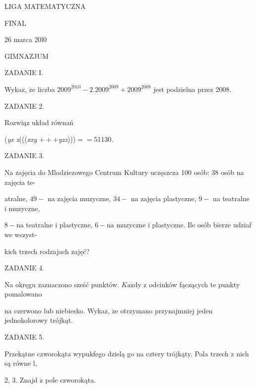 \documentclass[a4paper,12pt]{article}
\begin{document}
LIGA MATEMATYCZNA

FINAL

26 marca 20l0

GIMNAZJUM

ZADANIE I.

Wykaz, $\dot{\mathrm{z}}\mathrm{e}$ liczba $2009^{2010}-2. 2009^{2009}+2009^{2008}$ jest podzielna przez 2008.

ZADANIE 2.

Rozwiąz układ równań

({\it yx  z}((({\it xxy} $+++${\it yzz})))$==$51130.

ZADANIE 3.

Na zajęcia do Mlodziezowego Centrum Kultury uczęszcza 100 osób: 38 osób na zajęcia te-

atralne, $49-$ na zajęcia muzyczne, $34-$ na zajęcia plastyczne, $9-$ na teatralne i muzyczne,

$8-\mathrm{n}\mathrm{a}$ teatralne i plastyczne, $6-\mathrm{n}\mathrm{a}$ muzyczne i plastyczne. Ile osób bierze udziaf we wszyst-

kich trzech rodzajach zajęć?

ZADANIE 4.

Na okręgu zaznaczono sześć punktów. $K\mathrm{a}\dot{\mathrm{z}}\mathrm{d}\mathrm{y}$ z odcinków fączących te punkty pomalowano

na czerwono lub niebiesko. Wykaz, $\dot{\mathrm{z}}\mathrm{e}$ otrzymano przynajmniej jeden jednokolorowy trójkąt.

ZADANIE 5.

Przekątne czworokąta wypukfego dzielą go na cztery trójkąty. Pola trzech z nich są równe l,

2, 3. Znajd $\acute{\mathrm{z}}$ pole czworokąta.
\end{document}
